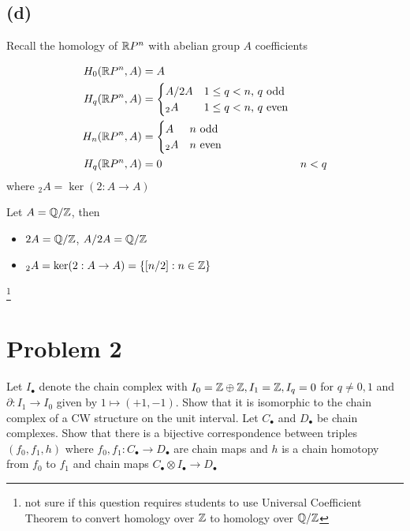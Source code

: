 \documentclass{article}
\begin{document}
\subsection{(d)}

Recall the homology of $\mathbb{R} P^n$ with abelian group $A$ coefficients

\begin{proposition}
    \begin{align*}
        H_0(\mathbb{R} P^n, A) &= A \\
        H_q(\mathbb{R} P^n, A) &= \begin{cases}
            A / 2A &\text{$1 \leq q < n$, $q$ odd} \\
            {}_2A &\text{$1 \leq q < n$, $q$ even}
        \end{cases} \\
        H_n(\mathbb{R} P^n, A) &= \begin{cases}
            A &\text{$n$ odd} \\
            {}_2A &\text{$n$ even}
        \end{cases} \\ 
        H_q(\mathbb{R} P^n, A) &= 0 &\text{$n < q$}
    \end{align*}
    where ${}_2A = \ker (2: A \to A)$
\end{proposition}

Let $A = \mathbb{Q} / \mathbb{Z}$, then 
\begin{itemize}
    \item $2A = \mathbb{Q} / \mathbb{Z}$, $A / 2A = \mathbb{Q} / \mathbb{Z}$
    \item ${}_2A = \ker (2: A \to A)= \{[n / 2]: n \in \mathbb{Z}\}$
\end{itemize}

\footnote{not sure if this question requires students to use Universal Coefficient Theorem to convert homology over $\mathbb{Z}$ to homology over $\mathbb{Q}/\mathbb{Z}$}

\section{Problem 2}

Let $I_\bullet$ denote the chain complex with $I_0 = \mathbb{Z} \oplus \mathbb{Z}, I_1 = \mathbb{Z}, I_q = 0$ for $q \neq 0, 1$ and $\partial: I_1 \to I_0$ given by $1 \mapsto (+1, -1)$. Show that it is isomorphic to the chain complex of a CW structure on the unit interval. Let $C_\bullet$ and $D_\bullet$ be chain complexes. Show that there is a bijective correspondence between triples $(f_0, f_1, h)$ where $f_0, f_1: C_\bullet \to D_\bullet$ are chain maps and $h$ is a chain homotopy from $f_0$ to $f_1$ and chain maps $C_\bullet \otimes I_\bullet \to D_\bullet$
\end{document}
